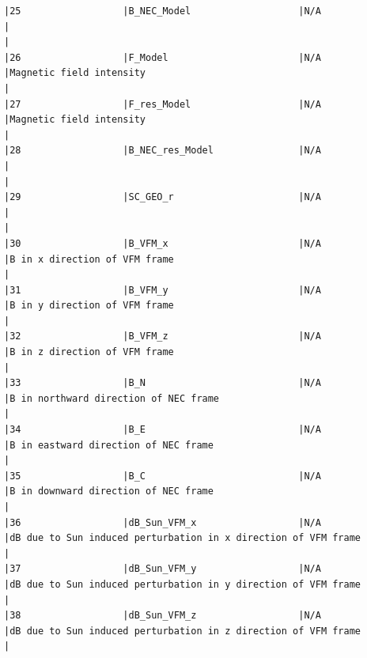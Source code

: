 \begin{verbatim}
|25                  |B_NEC_Model                   |N/A                           |                                                                                                    |
|26                  |F_Model                       |N/A                           |Magnetic field intensity                                                                            |
|27                  |F_res_Model                   |N/A                           |Magnetic field intensity                                                                            |
|28                  |B_NEC_res_Model               |N/A                           |                                                                                                    |
|29                  |SC_GEO_r                      |N/A                           |                                                                                                    |
|30                  |B_VFM_x                       |N/A                           |B in x direction of VFM frame                                                                       |
|31                  |B_VFM_y                       |N/A                           |B in y direction of VFM frame                                                                       |
|32                  |B_VFM_z                       |N/A                           |B in z direction of VFM frame                                                                       |
|33                  |B_N                           |N/A                           |B in northward direction of NEC frame                                                               |
|34                  |B_E                           |N/A                           |B in eastward direction of NEC frame                                                                |
|35                  |B_C                           |N/A                           |B in downward direction of NEC frame                                                                |
|36                  |dB_Sun_VFM_x                  |N/A                           |dB due to Sun induced perturbation in x direction of VFM frame                                      |
|37                  |dB_Sun_VFM_y                  |N/A                           |dB due to Sun induced perturbation in y direction of VFM frame                                      |
|38                  |dB_Sun_VFM_z                  |N/A                           |dB due to Sun induced perturbation in z direction of VFM frame                                      |

\end{verbatim}
